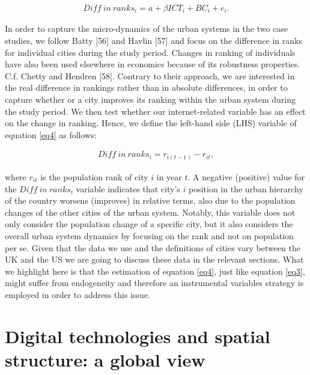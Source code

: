 \documentclass[10pt,letterpaper]{article}
\begin{document}
\begin{align}
Diff\:in\:ranks_{i} = a + \beta ICT_{i} + B C_{i} + e_{i}.\label{eq4}
\end{align}

In order to capture the micro-dynamics of the urban systems in the two
case studies, we follow Batty {[}56{]} and Havlin {[}57{]} and focus on
the difference in ranks for individual cities during the study period.
Changes in ranking of individuals have also been used elsewhere in
economics because of its robustness properties. C.f. Chetty and Hendren
{[}58{]}. Contrary to their approach, we are interested in the real
difference in rankings rather than in absolute differences, in order to
capture whether or a city improves its ranking within the urban system
during the study period. We then test whether our internet-related
variable has an effect on the change in ranking. Hence, we define the
left-hand side (LHS) variable of equation \ref{eq4} as follows:

\begin{align}
Diff\:in\:ranks_{i} = r_{i(t-1)} - r_{it},\label{eq5}
\end{align}

\noindent where \(r_{it}\) is the population rank of city \(i\) in year
\(t\). A negative (positive) value for the \(Diff\:in\:ranks_{i}\)
variable indicates that city's \(i\) position in the urban hierarchy of
the country worsens (improves) in relative terms, also due to the
population changes of the other cities of the urban system. Notably,
this variable does not only consider the population change of a specific
city, but it also considers the overall urban system dynamics by
focusing on the rank and not on population per se. Given that the data
we use and the definitions of cities vary between the UK and the US we
are going to discuss these data in the relevant sections. What we
highlight here is that the estimation of equation \ref{eq4}, just like
equation \ref{eq3}, might suffer from endogeneity and therefore an
instrumental variables strategy is employed in order to address this
issue.

\hypertarget{sec4}{%
\section{Digital technologies and spatial structure: a global
view}\label{sec4}}
\end{document}
